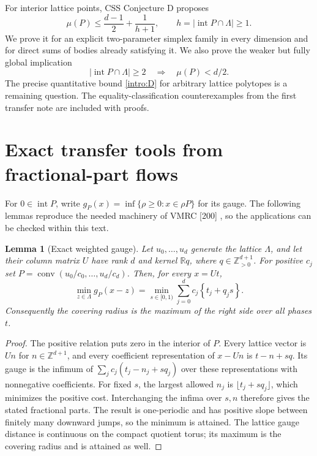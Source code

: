 \documentclass[11pt,a4paper]{article}
\newtheorem{lemma}[theorem]{Lemma}
\theoremstyle{remark}\newtheorem{remark}[theorem]{Remark}
\DeclareMathOperator{\conv}{conv}
\DeclareMathOperator{\inter}{int}
\newcommand{\R}{\mathbb R}\newcommand{\Z}{\mathbb Z}
\newcommand{\fr}[1]{\left\{#1\right\}}\newcommand{\one}{\mathbf1}
\begin{document}
For interior lattice points, CSS Conjecture D proposes
\begin{equation}\label{intro:D}
 \mu(P)\le\frac{d-1}{2}+\frac1{h+1},\qquad
 h=|\inter P\cap\Lambda|\ge1.
\end{equation}
We prove it for an explicit two-parameter simplex family in every
dimension and for direct sums of bodies already satisfying it.
We also prove the weaker but fully global implication
\[
 |\inter P\cap\Lambda|\ge2\quad\Longrightarrow\quad\mu(P)<d/2.
\]
The precise quantitative bound \eqref{intro:D} for arbitrary lattice
polytopes is a remaining question. The equality-classification
counterexamples from the first transfer note are included with proofs.

\section{Exact transfer tools from fractional-part flows}
\label{sec:tools}
For $0\in\inter P$, write
$g_P(x)=\inf\{\rho\ge0:x\in\rho P\}$ for its gauge.
The following lemmas reproduce the needed machinery of VMRC [200]
\cite{VMRC200}, so the applications can be checked within this text.

\begin{lemma}[Exact weighted gauge]\label{tool:gauge}
Let $u_0,\ldots,u_d$ generate the lattice $\Lambda$, and let their
column matrix $U$ have rank $d$ and kernel $\R q$, where
$q\in\Z_{>0}^{d+1}$. For positive $c_j$ set
$P=\conv(u_0/c_0,\ldots,u_d/c_d)$. Then, for every $x=Ut$,
\begin{equation}\label{tool:gaugeeq}
 \min_{z\in\Lambda}g_P(x-z)
 =\min_{s\in[0,1)}\sum_{j=0}^dc_j\fr{t_j+q_js}.
\end{equation}
Consequently the covering radius is the maximum of the right side
over all phases $t$.
\end{lemma}
\begin{proof}
The positive relation puts zero in the interior of $P$.
Every lattice vector is $Un$ for $n\in\Z^{d+1}$, and every
coefficient representation of $x-Un$ is $t-n+sq$.
Its gauge is the infimum of $\sum_jc_j(t_j-n_j+sq_j)$ over these
representations with nonnegative coefficients. For fixed $s$,
the largest allowed $n_j$ is $\lfloor t_j+sq_j\rfloor$, which
minimizes the positive cost. Interchanging the infima over $s,n$
therefore gives the stated fractional parts. The result is
one-periodic and has positive slope between finitely many downward
jumps, so the minimum is attained. The lattice gauge distance is
continuous on the compact quotient torus; its maximum is the
covering radius and is attained as well.
\end{proof}
\end{document}
